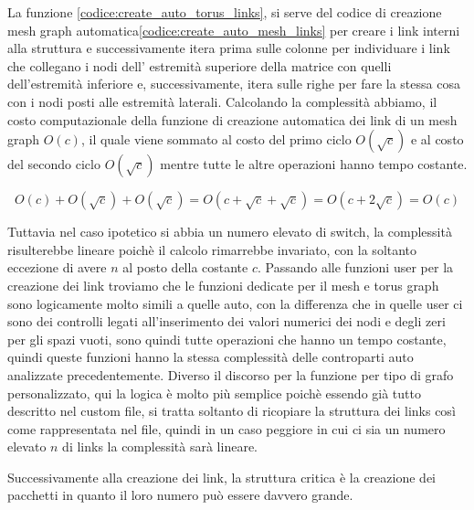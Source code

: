\documentclass[binding=0.6cm]{sapthesis}
\begin{document}
La funzione \ref{codice:create_auto_torus_links}, si serve del codice di creazione mesh graph automatica\ref{codice:create_auto_mesh_links} per 
creare i link interni alla struttura e successivamente itera prima sulle colonne per individuare i link che collegano i nodi dell' estremità superiore della matrice con quelli dell'estremità inferiore e,
successivamente, itera sulle righe per fare la stessa cosa con i nodi posti alle estremità laterali.
Calcolando la complessità abbiamo, il costo computazionale della funzione di creazione automatica dei link di un mesh graph \(O(c)\), il quale
viene sommato al costo del primo ciclo \(O(\sqrt{c})\) e al costo del secondo ciclo \(O(\sqrt{c})\) mentre tutte le altre operazioni hanno tempo costante.

\[
    O(c) + O(\sqrt{c}) + O(\sqrt{c}) = O(c + \sqrt{c} + \sqrt{c}) = O(c + 2\sqrt{c}) = O(c)
\]

Tuttavia nel caso ipotetico si abbia un numero elevato di switch, la complessità risulterebbe lineare poichè il calcolo rimarrebbe invariato, con la soltanto
eccezione di avere \(n\) al posto della costante \(c\).
Passando alle funzioni user per la creazione dei link troviamo che le funzioni dedicate per il mesh e torus graph sono logicamente molto simili a quelle auto, con
la differenza che in quelle user ci sono dei controlli legati all'inserimento dei valori numerici dei nodi e degli zeri per gli spazi vuoti, sono quindi tutte operazioni che hanno un tempo costante,
quindi queste funzioni hanno la stessa complessità delle controparti auto analizzate precedentemente.
Diverso il discorso per la funzione per tipo di grafo personalizzato, qui la logica è molto più semplice
poichè essendo già tutto descritto nel custom file, si tratta soltanto di ricopiare la struttura dei links così come rappresentata nel file,
quindi in un caso peggiore in cui ci sia un numero elevato \(n\) di links la complessità sarà lineare.

Successivamente alla creazione dei link, la struttura critica è la creazione dei pacchetti in quanto il loro numero può essere davvero grande.
\end{document}
